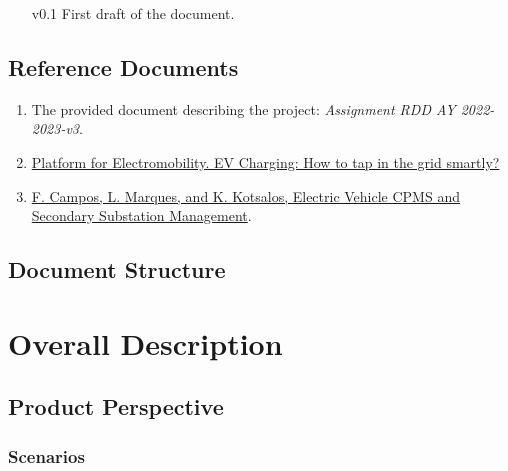 \documentclass[11pt]{article}
\begin{document}
\begin{enumerate}
    \item[v0.1] First draft of the document.
\end{enumerate}

\subsection{Reference Documents}

\begin{enumerate}
    \item The provided document describing the project: \textit{Assignment RDD AY 2022-2023-v3}.
    \item \href{https://www.platformelectromobility.eu/2022/05/17/ev-charging-how-to-tap-in-the-grid-smartly/}{Platform for Electromobility. EV Charging: How to tap in the grid smartly?}
    \item \href{https://mobilityintegrationsymposium.org/wp-content/uploads/sites/10/2018/11/4A_3_Emob18_024_paper_Filipe_Campos.pdf}{F. Campos, L. Marques, and K. Kotsalos, Electric Vehicle CPMS and Secondary Substation Management}.
\end{enumerate}

\subsection{Document Structure}

\section{Overall Description}

\subsection{Product Perspective}

\subsubsection{Scenarios}
\label{subsubsec:scenarios}
\end{document}
